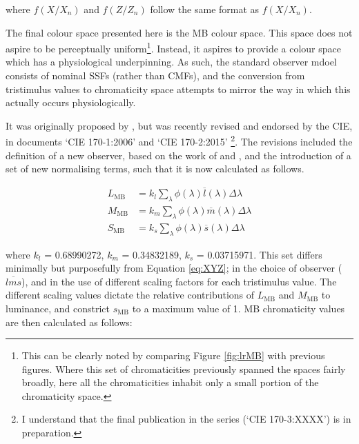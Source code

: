 where $f(X/X_{n})$ and $f(Z/Z_{n})$ follow the same format as $f(X/X_{n})$.

The final colour space presented here is the \acrfull{MB} colour space. This space does not aspire to be perceptually uniform\footnote{This can be clearly noted by comparing Figure \ref{fig:lrMB} with previous figures. Where this set of chromaticities previously spanned the spaces fairly broadly, here all the chromaticities inhabit only a small portion of the chromaticity space.}. Instead, it aspires to provide a colour space which has a physiological underpinning. As such, the standard observer mdoel consists of nominal \glspl{SSF} (rather than \glspl{CMF}), and the conversion from tristimulus values to chromaticity space attempts to mirror the way in which this actually occurs physiologically.

It was originally proposed by \citet{macleod_chromaticity_1979}, but was recently revised and endorsed by the \gls{CIE}, in documents `CIE 170-1:2006' \citep{cie_cie_2006} and `CIE 170-2:2015' \citep{cie_cie_2015}\footnote{I understand that the final publication in the series (`CIE 170-3:XXXX') is in preparation.}. The revisions included the definition of a new observer, based on the work of \citet{stockman_spectral_1999} and \citet{stockman_spectral_2000}, and the introduction of a set of new normalising terms, such that it is now calculated as follows.

\begin{subequations}
\begin{align}
L_{\text{MB}}&=k_{l} \sum_{\lambda} \phi(\lambda) \overline{l}(\lambda) \Delta \lambda \\ 
M_{\text{MB}}&=k_{m} \sum_{\lambda} \phi(\lambda) \overline{m}(\lambda) \Delta \lambda \\ 
S_{\text{MB}}&=k_{s} \sum_{\lambda} \phi(\lambda) \overline{s}(\lambda) \Delta \lambda
\end{align}
\label{eq:MBTristim}
\end{subequations}

where $k_{l}$ = 0.68990272, $k_{m}$ = 0.34832189, $k_{s}$ = 0.03715971. This set differs minimally but purposefully from Equation \ref{eq:XYZ}; in the choice of observer ($\overline{lms}$), and in the use of different scaling factors for each tristimulus value. The different scaling values dictate the relative contributions of $L_{\text{MB}}$ and $M_{\text{MB}}$ to luminance, and constrict $s_{\text{MB}}$ to a maximum value of 1. \gls{MB} chromaticity values are then calculated as follows:

